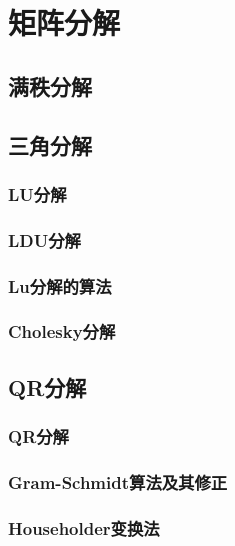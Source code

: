 \chapter{矩阵分解}
\label{cha:矩阵分解}

\section{满秩分解}
\label{sec:满秩分解}

\section{三角分解}
\label{sec:三角分解}

\subsection{LU分解}
\label{sub:LU分解}

\subsection{LDU分解}
\label{sub:LDU分解}

\subsection{Lu分解的算法}
\label{sub:Lu分解的算法}

\subsection{Cholesky分解}
\label{sub:Cholesky分解}

\section{QR分解}
\label{sec:QR分解}

\subsection{QR分解}
\label{sub:QR分解}

\subsection{Gram-Schmidt算法及其修正}
\label{sub:Gram-Schmidt算法及其修正}

\subsection{Householder变换法}
\label{sub:Householder变换法}

